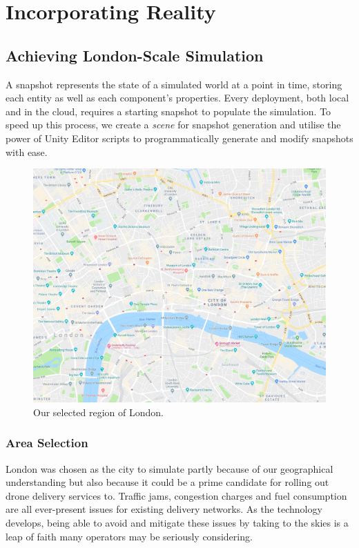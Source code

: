 \documentclass[a4paper,11pt,titlepage]{report}
\begin{document}
\part{Incorporating Reality}
\chapter{Achieving London-Scale Simulation}
A snapshot represents the state of a simulated world at a point in time, storing each entity as well as each component's properties. Every deployment, both local and in the cloud, requires a starting snapshot to populate the simulation. To speed up this process, we create a \textit{scene} for snapshot generation and utilise the power of Unity Editor scripts to programmatically generate and modify snapshots with ease.

\begin{figure}[!hbpt]
  \center
  \includegraphics[width=0.9\linewidth]{img/london_snapshot_small.png}
  \caption{Our selected region of London. \cite{Google2018a}}
  \label{fig:london_snapshot_small}
\end{figure}

\section{Area Selection}
London was chosen as the city to simulate partly because of our geographical understanding but also because it could be a prime candidate for rolling out drone delivery services to. Traffic jams, congestion charges and fuel consumption are all ever-present issues for existing delivery networks. As the technology develops, being able to avoid and mitigate these issues by taking to the skies is a leap of faith many operators may be seriously considering.\\
\end{document}
